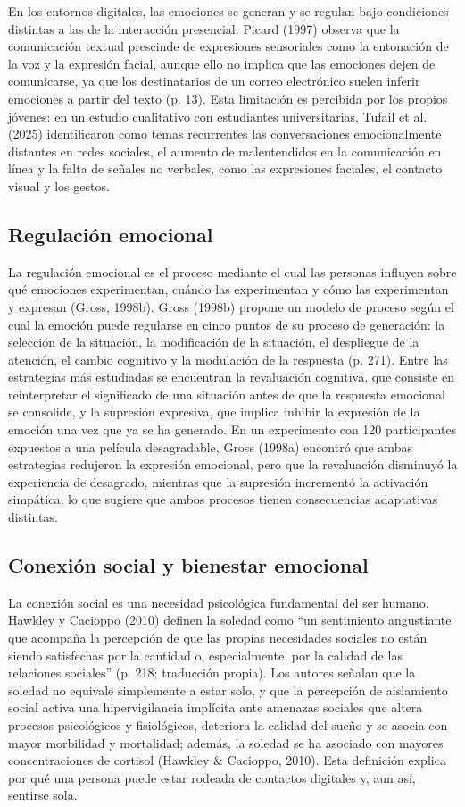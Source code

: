 En los entornos digitales, las emociones se generan y se regulan bajo condiciones distintas a las de la interacción presencial. Picard (1997) observa que la comunicación textual prescinde de expresiones sensoriales como la entonación de la voz y la expresión facial, aunque ello no implica que las emociones dejen de comunicarse, ya que los destinatarios de un correo electrónico suelen inferir emociones a partir del texto (p. 13). Esta limitación es percibida por los propios jóvenes: en un estudio cualitativo con estudiantes universitarias, Tufail et al. (2025) identificaron como temas recurrentes las conversaciones emocionalmente distantes en redes sociales, el aumento de malentendidos en la comunicación en línea y la falta de señales no verbales, como las expresiones faciales, el contacto visual y los gestos.

\subsection{Regulación emocional}
La regulación emocional es el proceso mediante el cual las personas influyen sobre qué emociones experimentan, cuándo las experimentan y cómo las experimentan y expresan (Gross, 1998b). Gross (1998b) propone un modelo de proceso según el cual la emoción puede regularse en cinco puntos de su proceso de generación: la selección de la situación, la modificación de la situación, el despliegue de la atención, el cambio cognitivo y la modulación de la respuesta (p. 271). Entre las estrategias más estudiadas se encuentran la revaluación cognitiva, que consiste en reinterpretar el significado de una situación antes de que la respuesta emocional se consolide, y la supresión expresiva, que implica inhibir la expresión de la emoción una vez que ya se ha generado. En un experimento con 120 participantes expuestos a una película desagradable, Gross (1998a) encontró que ambas estrategias redujeron la expresión emocional, pero que la revaluación disminuyó la experiencia de desagrado, mientras que la supresión incrementó la activación simpática, lo que sugiere que ambos procesos tienen consecuencias adaptativas distintas.

\subsection{Conexión social y bienestar emocional}
La conexión social es una necesidad psicológica fundamental del ser humano. Hawkley y Cacioppo (2010) definen la soledad como ``un sentimiento angustiante que acompaña la percepción de que las propias necesidades sociales no están siendo satisfechas por la cantidad o, especialmente, por la calidad de las relaciones sociales'' (p. 218; traducción propia). Los autores señalan que la soledad no equivale simplemente a estar solo, y que la percepción de aislamiento social activa una hipervigilancia implícita ante amenazas sociales que altera procesos psicológicos y fisiológicos, deteriora la calidad del sueño y se asocia con mayor morbilidad y mortalidad; además, la soledad se ha asociado con mayores concentraciones de cortisol (Hawkley \& Cacioppo, 2010). Esta definición explica por qué una persona puede estar rodeada de contactos digitales y, aun así, sentirse sola.

